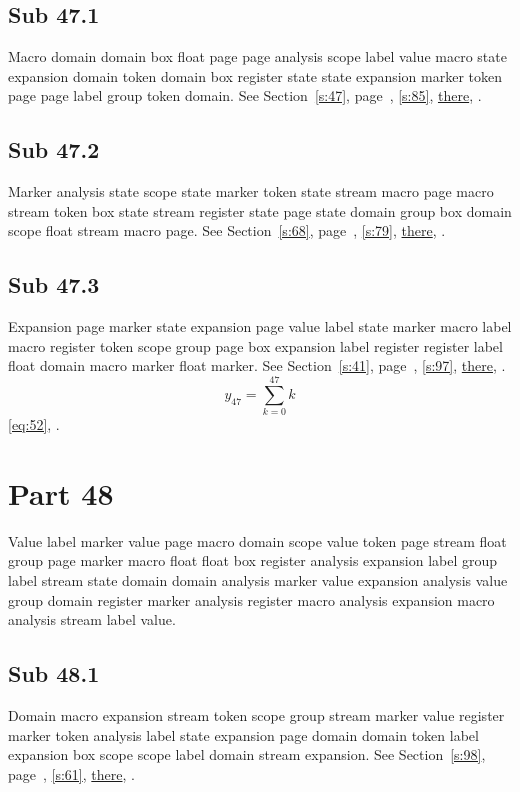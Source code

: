 \documentclass[11pt]{article}
\begin{document}
\subsection{Sub 47.1}\label{ss:47.1} Macro domain domain box float page page analysis scope label value macro state expansion domain token domain box register state state expansion marker token page page label group token domain. See Section~\ref{s:47}, page~\pageref{ss:47.2}, \cref{s:85}, \hyperref[s:31]{there}, \cite{k76,k115}.
\subsection{Sub 47.2}\label{ss:47.2} Marker analysis state scope state marker token state stream macro page macro stream token box state stream register state page state domain group box domain scope float stream macro page. See Section~\ref{s:68}, page~\pageref{ss:6.3}, \cref{s:79}, \hyperref[s:61]{there}, \cite{k83,k91}.
\subsection{Sub 47.3}\label{ss:47.3} Expansion page marker state expansion page value label state marker macro label macro register token scope group page box expansion label register register label float domain macro marker float marker. See Section~\ref{s:41}, page~\pageref{ss:2.3}, \cref{s:97}, \hyperref[s:100]{there}, \cite{k20,k30}.
\begin{equation}y_{47}=\sum_{k=0}^{47}k\label{eq:47}\end{equation} \eqref{eq:52}, .
\section{Part 48}\label{s:48}
Value label marker value page macro domain scope value token page stream float group page marker macro float float box register analysis expansion label group label stream state domain domain analysis marker value expansion analysis value group domain register marker analysis register macro analysis expansion macro analysis stream label value.
\subsection{Sub 48.1}\label{ss:48.1} Domain macro expansion stream token scope group stream marker value register marker token analysis label state expansion page domain domain token label expansion box scope scope label domain stream expansion. See Section~\ref{s:98}, page~\pageref{ss:84.1}, \cref{s:61}, \hyperref[s:18]{there}, \cite{k54,k64}.
\end{document}

